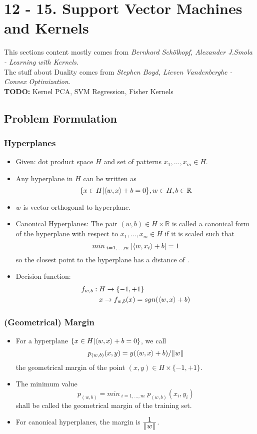 \section*{12 - 15. Support Vector Machines and Kernels}
This sections content mostly comes from \textit{Bernhard Schölkopf, Alexander J.Smola - Learning with Kernels}.\\
The stuff about Duality comes from \textit{Stephen Boyd, Lieven Vandenberghe - Convex Optimization}.\\
\textbf{TODO:} Kernel PCA, SVM Regression, Fisher Kernels
\subsection*{Problem Formulation}
\subsubsection*{Hyperplanes}
\begin{itemize}
    \item
        Given: dot product space $H$ and set of patterns $x_{1}, \dots, x_{m} \in H$.
    \item
        Any hyperplane in $H$ can be written as 
        $$\{x \in H | \langle w, x\rangle + b = 0\}, w \in H, b \in \mathbb{R}$$
    \item
        $w$ is vector orthogonal to hyperplane.
    \item
        Canonical Hyperplanes: 
        The pair $(w,b) \in H \times \mathbb{R}$ is called a canonical form of the hyperplane with respect to $x_{1}, \dots, x_{m} \in H$ if it is scaled such that
        $$ min_{\; i=1, \dots, m \;} \lvert\langle w, x_{i}\rangle + b\rvert = 1$$
        so the closest point to the hyperplane has a distance of .
    \item
        Decision function:
        \begin{align*}
        f_{w,b}: \; & H \rightarrow \{-1, +1\}\\
            & x \rightarrow f_{w,b}(x) = sgn(\langle w,x\rangle+b)
        \end{align*}
\end{itemize}

\subsubsection*{(Geometrical) Margin}
\begin{itemize}
    \item
        For a hyperplane $\{x \in H | \langle w,x\rangle +b = 0\}$, we call
        $$ p_{(w, b)}(x,y) = y(\langle w,x\rangle+b)/\lVert w\rVert$$
        the geometrical margin of the point $(x,y) \in H \times \{-1, +1\}$.

    \item
        The minimum value
        $$ p_{(w, b)} = min_{\;i=1,\dots,m} \;p_{(w, b)}(x_{i},y_{i})$$
        shall be called the geometrical margin of the training set.
    \item
        For canonical hyperplanes, the margin is $\frac{\displaystyle 1}{\displaystyle \lVert w\rVert}$.
\end{itemize}

